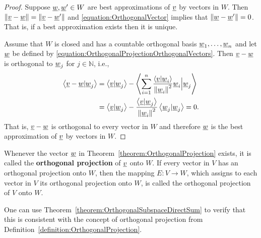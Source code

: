 \begin{proof}
Suppose $\underline{w}, \underline{w}' \in W$ are best approximations of $\underline{v}$ by vectors in $W$.
Then $\left\| \underline{v} - \underline{w} \right\| = \left\| \underline{v} - \underline{w}' \right\|$ and \eqref{equation:OrthogonalVector} implies that $\left\| \underline{w} - \underline{w}' \right\| = 0$.
That is, if a best approximation exists then it is unique.

Assume that $W$ is closed and has a countable orthogonal basis $\underline{w}_1, \ldots, \underline{w}_n$ and let $\underline{w}$ be defined by \eqref{equation:OrthogonalProjectionOrthogonalVectors}.
Then $\underline{v} -\underline{w}$ is orthogonal to $\underline{w}_j$ for $j \in \mathbb{N}$, i.e.,
\begin{equation*}
\begin{split}
\left\langle \underline{v} - \underline{w} | \underline{w}_j \right\rangle
&= \left\langle \underline{v} | \underline{w}_j \right\rangle
- \left\langle \sum_{i=1}^n \frac{ \left\langle \underline{v} | \underline{w}_i \right\rangle }{ \left\| \underline{w}_i \right\|^2 } \underline{w}_i \Big| \underline{w}_j \right\rangle \\
&= \left\langle \underline{v} | \underline{w}_j \right\rangle
- \frac{ \left\langle \underline{v} | \underline{w}_j \right\rangle }{ \left\| \underline{w}_i \right\|^2 } \left\langle \underline{w}_j | \underline{w}_j \right\rangle
= 0.
\end{split}
\end{equation*}
That is, $\underline{v} - \underline{w}$ is orthogonal to every vector in $W$ and therefore $\underline{w}$ is the best approximation of $\underline{v}$ by vectors in $W$.
\end{proof}

\begin{definition}
Whenever the vector $\underline{w}$ in Theorem~\ref{theorem:OrthogonalProjection} exists, it is called the \textbf{orthogonal projection} of $\underline{v}$ onto $W$.
If every vector in $V$ has an orthogonal projection onto $W$, then the mapping $E: V \rightarrow W$, which assigns to each vector in $V$ its orthogonal projection onto $W$, is called the orthogonal projection of $V$ onto $W$.
\end{definition}

One can use Theorem~\ref{theorem:OrthogonalSubspaceDirectSum} to verify that this is consistent with the concept of orthogonal projection from Definition~\ref{definition:OrthogonalProjection}.


